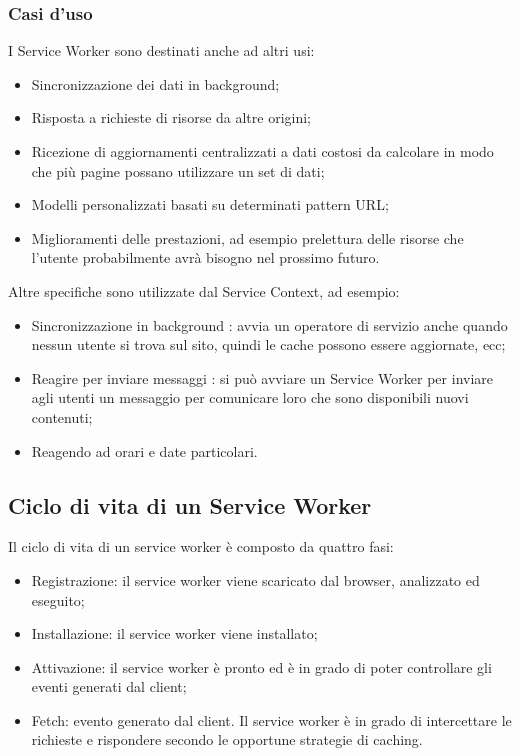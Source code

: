 \documentclass[11pt ,a4paper , twoside , openright ]{article}
\begin{document}
\subsubsection{Casi d'uso}
I Service Worker sono destinati anche ad altri usi:
\begin{itemize}
	\item Sincronizzazione dei dati in background;
	\item Risposta a richieste di risorse da altre origini;
	\item Ricezione di aggiornamenti centralizzati a dati costosi da calcolare in modo che più pagine possano utilizzare un set di dati;
	\item Modelli personalizzati basati su determinati pattern URL;
	\item Miglioramenti delle prestazioni, ad esempio prelettura delle risorse che l'utente probabilmente avrà bisogno nel prossimo futuro.
\end{itemize}
Altre specifiche sono utilizzate dal Service Context, ad esempio:
\begin{itemize}
	\item Sincronizzazione in background : avvia un operatore di servizio anche quando nessun utente si trova sul sito, quindi le cache possono essere aggiornate, ecc;
	\item Reagire per inviare messaggi : si può avviare un Service Worker per inviare agli utenti un messaggio per comunicare loro che sono disponibili nuovi contenuti;
	\item Reagendo ad orari e date particolari.
\end{itemize}

\subsection{Ciclo di vita di un Service Worker}
Il ciclo di vita di un service worker è composto da quattro fasi:
\begin{itemize}
	\item Registrazione: il service worker viene scaricato dal browser, analizzato ed eseguito;
	\item Installazione: il service worker viene installato;
	\item Attivazione: il service worker è pronto ed è in grado di poter controllare gli eventi generati dal client;
	\item Fetch: evento generato dal client. Il service worker è in grado di intercettare le richieste e rispondere secondo le opportune strategie di caching. 
\end{itemize}
\end{document}
